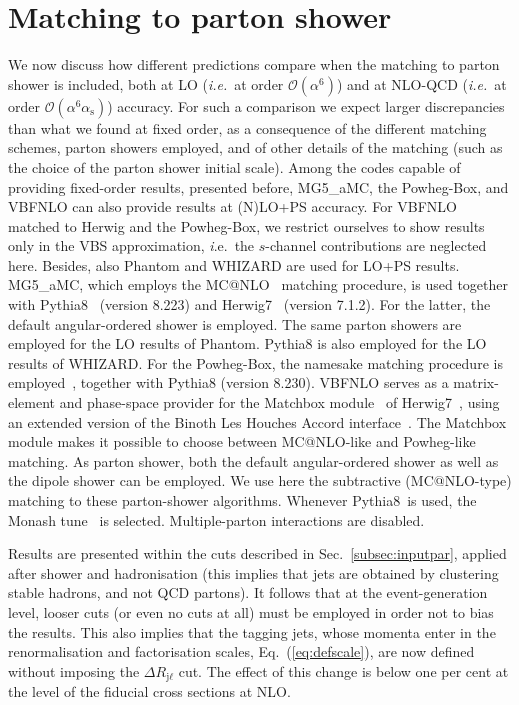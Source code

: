 \documentclass[twocolumn,epjc3]{svjour3} %
\newcommand{\Pl}{\ell}
\newcommand{\Pj}{\ensuremath{\text{j}}\xspace}
\newcommand{\alphas}{\ensuremath{\alpha_\text{s}}\xspace}
\begin{document}
\section{Matching to parton shower}
    \label{sec:matching}
We now discuss how different predictions compare when the matching to parton shower is included, both at LO 
(\emph{i.e.}\ at order $\mathcal O (\alpha^6)$) and at NLO-QCD (\emph{i.e.}\ at order $\mathcal O (\alpha^6\alphas)$) accuracy. For such
a comparison we expect larger discrepancies than what we found at fixed order, as a consequence of the different
matching schemes, parton showers employed, and of other details of the matching (such as the choice of the parton shower initial scale). Among
the codes capable of providing fixed-order results, presented before, {\sc MG5\_aMC}, the {\sc Powheg-Box}, and {\sc VBFNLO}
can also provide results at (N)LO+PS accuracy. For {\sc VBFNLO} matched to {\sc Herwig} and the {\sc Powheg-Box}, we
restrict ourselves to show results only in the VBS approximation,
{\emph i.e.}\ the $s$-channel contributions are neglected here. Besides,
also {\sc Phantom} and {\sc WHIZARD} are used for LO+PS results.\\
{\sc MG5\_aMC}, which employs the {\sc MC@NLO}~\cite{Frixione:2002ik} matching procedure, is used together with {\sc Pythia8}~\cite{Sjostrand:2014zea} (version 8.223)
and {\sc Herwig7}~\cite{Bellm:2015jjp,Bellm:2017bvx} (version 7.1.2). For the latter, the default angular-ordered shower is employed. 
The same parton showers are employed for the LO results of {\sc Phantom}.
{\sc Pythia8} is also employed for the LO results of {\sc WHIZARD}. For the {\sc Powheg-Box}, the namesake
matching procedure is employed~\cite{Nason:2004rx,Frixione:2007vw}, together with {\sc Pythia8} (version 8.230). {\sc VBFNLO} serves as a matrix-element and phase-space provider
for the {\sc Matchbox} module~\cite{Platzer:2011bc} of {\sc
Herwig7}~\cite{Bellm:2015jjp,Bellm:2017bvx}, using an extended version of the Binoth Les Houches Accord
interface~\cite{Binoth:2010xt,Alioli:2013nda,Andersen:2014efa}. The {\sc Matchbox} module makes it
possible to choose between {\sc MC\-@NLO}-like and {\sc Powheg}-like
matching. As parton show\-er, both the default angular-ordered shower as
well as the dipole shower can be employed. We use here the subtractive (MC@NLO-type) matching to these parton-show\-er algorithms.
Whenever {\sc Pythia8}\ is used, the Monash tune~\cite{Skands:2014pea} is selected. Multiple-parton interactions are disabled.

Results are presented within the cuts described in Sec.~\ref{subsec:inputpar}, applied after shower and hadronisation (this implies that jets
are obtained by clustering stable hadrons, and not QCD partons). It follows that at the event-generation level, looser cuts (or even no cuts at all)
must be employed in order not to bias the results. This also implies that the tagging jets, whose momenta enter in the 
renormalisation and factorisation scales, Eq.~(\ref{eq:defscale}), are now defined without imposing
the $\Delta R_{\Pj\Pl}$ cut. The effect of this change is below one per cent at the level of the fiducial cross sections at NLO.
\end{document}
